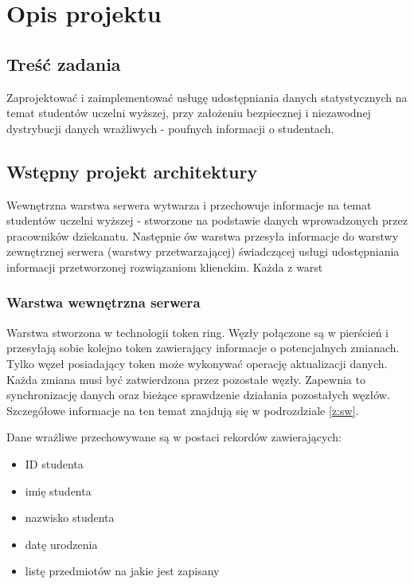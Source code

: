\chapter[Opis projektu]{Opis projektu}

\section[Treść zadania]{Treść zadania}

\par{Zaprojektować i zaimplementować usługę udostępniania danych statystycznych na temat studentów uczelni wyższej, przy założeniu bezpiecznej i niezawodnej dystrybucji danych wrażliwych - poufnych informacji o studentach.}



\section[Wstępny projekt architektury]{Wstępny projekt architektury}

\par{Wewnętrzna warstwa serwera wytwarza i przechowuje informacje na temat studentów uczelni wyższej - stworzone na podstawie danych wprowadzonych przez pracowników dziekanatu. Następnie ów warstwa przesyła informacje do warstwy zewnętrznej serwera (warstwy przetwarzającej) świadczącej usługi udostępniania informacji przetworzonej rozwiązaniom klienckim. Każda z warst}

\subsection*[Warstwa wewnętrzna serwera]{Warstwa wewnętrzna serwera}

\par{Warstwa stworzona w technologii token ring. Węzły połączone są w pierścień i przesyłają sobie kolejno token zawierający informacje o potencjalnych zmianach. Tylko węzeł posiadający token może wykonywać operację aktualizacji danych. Każda zmiana musi być zatwierdzona przez pozostałe węzły. Zapewnia to synchronizację danych oraz bieżące sprawdzenie działania pozostałych węzłów. Szczegółowe informacje na ten temat znajdują się w podrozdziale \ref{z:sw}.}

\par{Dane wrażliwe przechowywane są w postaci rekordów zawierających:}

\begin{itemize}
\item ID studenta
\item imię studenta
\item nazwisko studenta
\item datę urodzenia
\item listę przedmiotów na jakie jest zapisany
\end{itemize}

